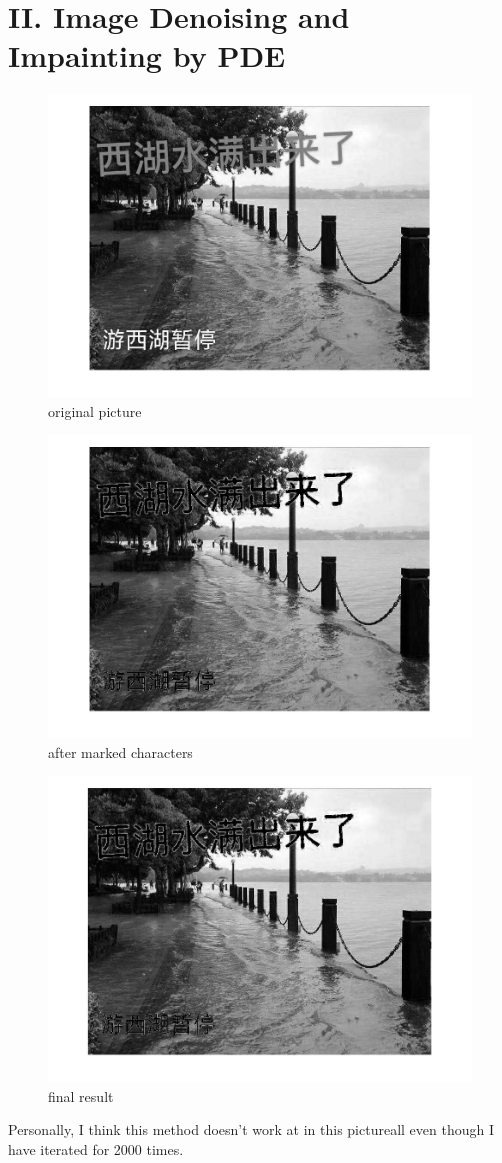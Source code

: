 \documentclass[twoside,a4paper]{article}
\begin{document}
\section*{II. Image Denoising and Impainting by PDE}
\begin{figure}[H]
\centering
\includegraphics[width=5in]{og.jpg}
\caption{original picture}
\end{figure}
\begin{figure}[H]
\centering
\includegraphics[width=5in]{marked.jpg}
\caption{after marked characters}
\end{figure}
\begin{figure}[H]
\centering
\includegraphics[width=6in]{result.jpg}
\caption{final result}
\end{figure}
Personally, I think this method doesn't work at in this pictureall even though I have iterated for 2000 times.
\end{document}
